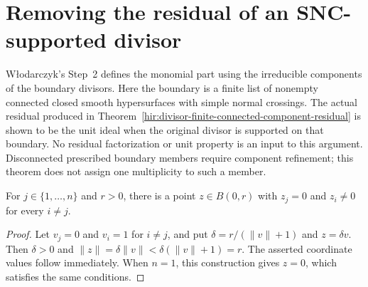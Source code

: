 \section{Removing the residual of an SNC-supported divisor}
\label{sec:hironaka-divisor-unit-extension}

W{\l}odarczyk's Step~2 defines the monomial part using the irreducible
components of the boundary divisors.  Here the boundary is a finite list
of nonempty connected closed smooth hypersurfaces with simple normal
crossings.  The actual residual produced in
Theorem~\ref{hir:divisor-finite-connected-component-residual} is shown to
be the unit ideal when the original divisor is supported on that boundary.
No residual factorization or unit property is an input to this argument.
Disconnected prescribed boundary members require component refinement;
this theorem does not assign one multiplicity to such a member.

\begin{lemma}
\label{hir:divisor-coordinate-unit-point}
\leanok
For $j\in\{1,\ldots,n\}$ and $r>0$, there is a point $z\in B(0,r)$
with $z_j=0$ and $z_i\ne0$ for every $i\ne j$.
\end{lemma}
\begin{proof}
Let $v_j=0$ and $v_i=1$ for $i\ne j$, and put
$\delta=r/(\|v\|+1)$ and $z=\delta v$.  Then $\delta>0$ and
$\|z\|=\delta\|v\|<\delta(\|v\|+1)=r$.
The asserted coordinate values follow immediately.  When $n=1$, this
construction gives $z=0$, which satisfies the same conditions.
\end{proof}

